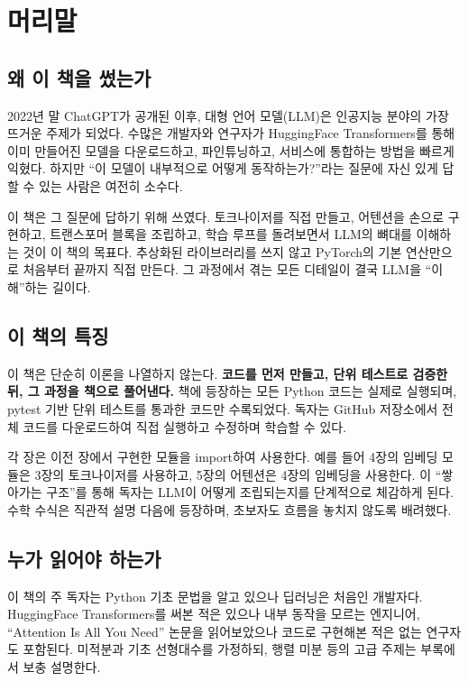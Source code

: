 
\chapter*{머리말}

\section*{왜 이 책을 썼는가}

2022년 말 ChatGPT가 공개된 이후, 대형 언어 모델(LLM)은 인공지능 분야의 가장 뜨거운 주제가 되었다. 수많은 개발자와 연구자가 HuggingFace Transformers를 통해 이미 만들어진 모델을 다운로드하고, 파인튜닝하고, 서비스에 통합하는 방법을 빠르게 익혔다. 하지만 ``이 모델이 내부적으로 어떻게 동작하는가?''라는 질문에 자신 있게 답할 수 있는 사람은 여전히 소수다.

이 책은 그 질문에 답하기 위해 쓰였다. 토크나이저를 직접 만들고, 어텐션을 손으로 구현하고, 트랜스포머 블록을 조립하고, 학습 루프를 돌려보면서 LLM의 뼈대를 이해하는 것이 이 책의 목표다. 추상화된 라이브러리를 쓰지 않고 PyTorch의 기본 연산만으로 처음부터 끝까지 직접 만든다. 그 과정에서 겪는 모든 디테일이 결국 LLM을 ``이해''하는 길이다.

\section*{이 책의 특징}

이 책은 단순히 이론을 나열하지 않는다. \textbf{코드를 먼저 만들고, 단위 테스트로 검증한 뒤, 그 과정을 책으로 풀어낸다.} 책에 등장하는 모든 Python 코드는 실제로 실행되며, pytest 기반 단위 테스트를 통과한 코드만 수록되었다. 독자는 GitHub 저장소에서 전체 코드를 다운로드하여 직접 실행하고 수정하며 학습할 수 있다.

각 장은 이전 장에서 구현한 모듈을 import하여 사용한다. 예를 들어 4장의 임베딩 모듈은 3장의 토크나이저를 사용하고, 5장의 어텐션은 4장의 임베딩을 사용한다. 이 ``쌓아가는 구조''를 통해 독자는 LLM이 어떻게 조립되는지를 단계적으로 체감하게 된다. 수학 수식은 직관적 설명 다음에 등장하며, 초보자도 흐름을 놓치지 않도록 배려했다.

\section*{누가 읽어야 하는가}

이 책의 주 독자는 Python 기초 문법을 알고 있으나 딥러닝은 처음인 개발자다. HuggingFace Transformers를 써본 적은 있으나 내부 동작을 모르는 엔지니어, ``Attention Is All You Need'' 논문을 읽어보았으나 코드로 구현해본 적은 없는 연구자도 포함된다. 미적분과 기초 선형대수를 가정하되, 행렬 미분 등의 고급 주제는 부록에서 보충 설명한다.

